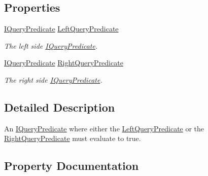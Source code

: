 \subsection*{Properties}
\begin{DoxyCompactItemize}
\item 
\hyperlink{interfaceCqrs_1_1Repositories_1_1Queries_1_1IQueryPredicate}{I\+Query\+Predicate} \hyperlink{classCqrs_1_1Repositories_1_1Queries_1_1OrQueryPredicate_afd9d98db1920b798bded515a27f0eeb6_afd9d98db1920b798bded515a27f0eeb6}{Left\+Query\+Predicate}
\begin{DoxyCompactList}\small\item\em The left side \hyperlink{interfaceCqrs_1_1Repositories_1_1Queries_1_1IQueryPredicate}{I\+Query\+Predicate}. \end{DoxyCompactList}\item 
\hyperlink{interfaceCqrs_1_1Repositories_1_1Queries_1_1IQueryPredicate}{I\+Query\+Predicate} \hyperlink{classCqrs_1_1Repositories_1_1Queries_1_1OrQueryPredicate_ae1a81d19657bee8735a977b247fef4d0_ae1a81d19657bee8735a977b247fef4d0}{Right\+Query\+Predicate}
\begin{DoxyCompactList}\small\item\em The right side \hyperlink{interfaceCqrs_1_1Repositories_1_1Queries_1_1IQueryPredicate}{I\+Query\+Predicate}. \end{DoxyCompactList}\end{DoxyCompactItemize}


\subsection{Detailed Description}
An \hyperlink{interfaceCqrs_1_1Repositories_1_1Queries_1_1IQueryPredicate}{I\+Query\+Predicate} where either the \hyperlink{classCqrs_1_1Repositories_1_1Queries_1_1OrQueryPredicate_afd9d98db1920b798bded515a27f0eeb6_afd9d98db1920b798bded515a27f0eeb6}{Left\+Query\+Predicate} or the \hyperlink{classCqrs_1_1Repositories_1_1Queries_1_1OrQueryPredicate_ae1a81d19657bee8735a977b247fef4d0_ae1a81d19657bee8735a977b247fef4d0}{Right\+Query\+Predicate} must evaluate to true. 



\subsection{Property Documentation}
\mbox{\label{classCqrs_1_1Repositories_1_1Queries_1_1OrQueryPredicate_afd9d98db1920b798bded515a27f0eeb6_afd9d98db1920b798bded515a27f0eeb6}} 
